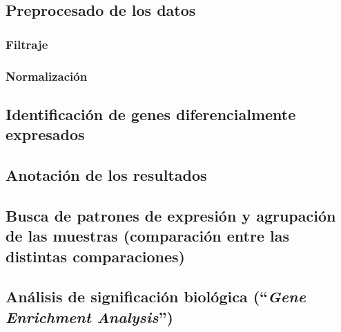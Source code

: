 \documentclass[
  english,
]{article}
\begin{document}
\hypertarget{preprocesado-de-los-datos}{%
\subsection{Preprocesado de los datos}\label{preprocesado-de-los-datos}}

\hypertarget{filtraje}{%
\subsubsection{Filtraje}\label{filtraje}}

\hypertarget{normalizaciuxf3n}{%
\subsubsection{Normalización}\label{normalizaciuxf3n}}

\hypertarget{identificaciuxf3n-de-genes-diferencialmente-expresados}{%
\subsection{Identificación de genes diferencialmente
expresados}\label{identificaciuxf3n-de-genes-diferencialmente-expresados}}

\hypertarget{anotaciuxf3n-de-los-resultados}{%
\subsection{Anotación de los
resultados}\label{anotaciuxf3n-de-los-resultados}}

\hypertarget{busca-de-patrones-de-expresiuxf3n-y-agrupaciuxf3n-de-las-muestras-comparaciuxf3n-entre-las-distintas-comparaciones}{%
\subsection{Busca de patrones de expresión y agrupación de las muestras
(comparación entre las distintas
comparaciones)}\label{busca-de-patrones-de-expresiuxf3n-y-agrupaciuxf3n-de-las-muestras-comparaciuxf3n-entre-las-distintas-comparaciones}}

\hypertarget{anuxe1lisis-de-significaciuxf3n-bioluxf3gica-gene-enrichment-analysis}{%
\subsection{\texorpdfstring{Análisis de significación biológica
(``\emph{Gene Enrichment
Analysis}'')}{Análisis de significación biológica (``Gene Enrichment Analysis'')}}\label{anuxe1lisis-de-significaciuxf3n-bioluxf3gica-gene-enrichment-analysis}}
\end{document}
